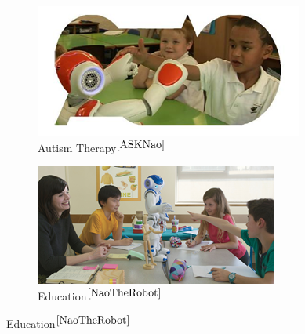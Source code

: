 \documentclass{llncs}
\begin{document}
\begin{figure}
\centering
\begin{subfigure}[t]{0.45\textwidth}
\includegraphics[width=\textwidth]{../thesis/assets/asknao.png}
\caption[Human Robot Interaction]{Autism Therapy$^{\cite{ASKNao}}$ }
\end{subfigure}
\begin{subfigure}[t]{0.45\textwidth}
\includegraphics[width=\textwidth]{../thesis/assets/nao_education.png}
\caption[Human Robot Interaction]{Education$^{\cite{NaoTheRobot}}$ }
\end{subfigure}


\end{figure}
\end{document}
